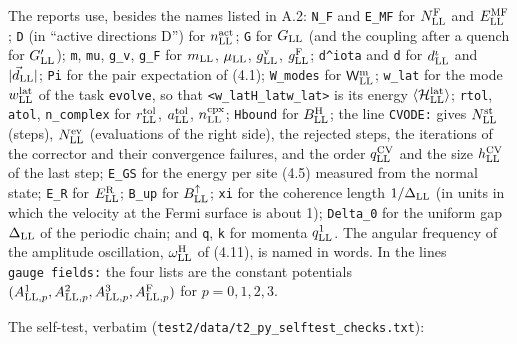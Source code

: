 \documentclass[
  10pt,
]{article}
\begin{document}
The reports use, besides the names listed in A.2: \texttt{N\_F} and
\texttt{E\_MF} for \(N^{\rm F}_{\rm LL}\) and \(E^{\rm MF}_{\rm LL}\);
\texttt{D} (in ``active directions D'') for \(n^{\rm act}_{\rm LL}\);
\texttt{G} for \(G_{\rm LL}\) (and the coupling after a quench for
\(G'_{\rm LL}\)); \texttt{m}, \texttt{mu}, \texttt{g\_v}, \texttt{g\_F}
for \(m_{\rm LL}\), \(\mu_{\rm LL}\), \(g^{\rm v}_{\rm LL}\),
\(g^{\rm F}_{\rm LL}\); \texttt{d\^{}iota} and
\texttt{\textbar{}d\textbar{}} for \(d^\iota_{\rm LL}\) and
\(\lvert\vec d_{\rm LL}\rvert\); \texttt{Pi} for the pair expectation of
(4.1); \texttt{W\_modes} for \(\mathsf W^{\rm m}_{\rm LL}\);
\texttt{w\_lat} for the mode \(w^{\rm lat}_{\rm LL}\) of the task
\texttt{evolve}, so that
\texttt{\textless{}w\_lat\textbar{}H\_lat\textbar{}w\_lat\textgreater{}}
is its energy \(\langle\mathcal H^{\rm lat}_{\rm LL}\rangle\);
\texttt{rtol}, \texttt{atol}, \texttt{n\_complex} for
\(r^{\rm tol}_{\rm LL}\), \(a^{\rm tol}_{\rm LL}\),
\(n^{\rm cpx}_{\rm LL}\); \texttt{Hbound} for \(B^{\rm H}_{\rm LL}\);
the line \texttt{CVODE:} gives \(N^{\rm st}_{\rm LL}\) (steps),
\(N^{\rm ev}_{\rm LL}\) (evaluations of the right side), the rejected
steps, the iterations of the corrector and their convergence failures,
and the order \(q^{\rm CV}_{\rm LL}\) and the size
\(h^{\rm CV}_{\rm LL}\) of the last step; \texttt{E\_GS} for the energy
per site (4.5) measured from the normal state; \texttt{E\_R} for
\(E^{\rm R}_{\rm LL}\); \texttt{B\_up} for \(B^\uparrow_{\rm LL}\);
\texttt{xi} for the coherence length \(1/\Delta_{\rm LL}\) (in units in
which the velocity at the Fermi surface is about 1); \texttt{Delta\_0}
for the uniform gap \(\Delta_{\rm LL}\) of the periodic chain; and
\texttt{q}, \texttt{k} for momenta \(q^1_{\rm LL}\). The angular
frequency of the amplitude oscillation, \(\omega^{\rm H}_{\rm LL}\) of
(4.11), is named in words. In the lines \texttt{gauge\ fields:} the four
lists are the constant potentials
\((A^1_{{\rm LL},p},A^2_{{\rm LL},p},A^3_{{\rm LL},p},A^{\rm F}_{{\rm LL},p})\)
for \(p=0,1,2,3\).

The self-test, verbatim
(\texttt{test2/data/t2\_py\_selftest\_checks.txt}):
\end{document}
